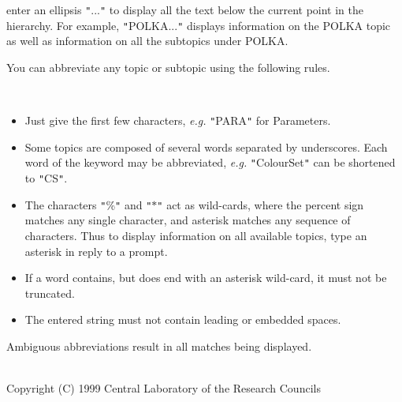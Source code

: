 \documentclass[twoside,11pt]{article}
\newcommand{\htmlref}[2]{#1}
\renewcommand{\_}{\texttt{\symbol{95}}}
\newcommand{\sstdiytopic}[2]{\item[{\hspace{-0.35em}#1\hspace{-0.35em}:}]
\mbox{} \\[1.3ex] #2}
\newcommand{\sstitemlist}[1]{
  \mbox{} \\
  \vspace{-3.5ex}
  \begin{itemize}
     #1
  \end{itemize}
}
\newcommand{\sstitem}{\item}
\newcommand{\sstdiytopic}[2]{\item[{#1}] #2 }
\newcommand{\sstitemlist}[1]{
      \begin{itemize}
         #1
      \end{itemize}
      \\
   }
\newcommand{\sstitem}{\item}
\begin{document}
{{{         \sstitem
            enter an ellipsis {\tt "}...{\tt "} to display all the text below the
               current point in the hierarchy.  For example, {\tt "}POLKA...{\tt "}
               displays information on the \htmlref{POLKA}{POLKA} topic as well as
               information on all the subtopics under POLKA.

      }
      You can abbreviate any topic or subtopic using the following
      rules.

      \sstitemlist{

         \sstitem
            Just give the first few characters, \emph{e.g.} {\tt "}PARA{\tt "} for
               Parameters.

         \sstitem
            Some topics are composed of several words separated by
               underscores.  Each word of the keyword may be abbreviated,
               \emph{e.g.} {\tt "}Colour\_Set{\tt "} can be shortened to {\tt "}C\_S{\tt "}.

         \sstitem
            The characters {\tt "}\%{\tt "} and {\tt "}$*${\tt "} act as wild-cards, where the
               percent sign matches any single character, and asterisk
               matches any sequence of characters.  Thus to display
               information on all available topics, type an asterisk in
               reply to a prompt.

         \sstitem
            If a word contains, but does end with an asterisk wild-card,
               it must not be truncated.

         \sstitem
            The entered string must not contain leading or embedded
               spaces.

      }
      Ambiguous abbreviations result in all matches being displayed.
   }
   \sstdiytopic{
      Copyright
   }{
      Copyright (C) 1999 Central Laboratory of the Research Councils
   }
}
\end{document}
